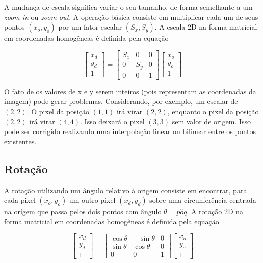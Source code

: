 \documentclass[12pt,oneside,a4paper,english,french,spanish,brazil,]{abntex2}
\begin{document}
A mudança de escala significa variar o seu tamanho, de forma semelhante a um \textit{zoom in} ou \textit{zoom out}. A operação básica consiste em multiplicar cada um de seus pontos \((x_o,y_o)\) por um fator escalar \((S_x,S_y)\). A escala 2D na forma matricial em coordenadas homogêneas é definida pela equação

\[
\begin{bmatrix}
x_d\\ 
y_d\\ 
1
\end{bmatrix}
=
\begin{bmatrix}
S_x & 0 & 0\\ 
0 & S_y & 0\\ 
0 & 0 & 1
\end{bmatrix}
\begin{bmatrix}
x_o\\ 
y_o\\ 
1
\end{bmatrix}
\]

O fato de os valores de x e y serem inteiros (pois representam as coordenadas da imagem) pode gerar problemas. Considerando, por exemplo, um escalar de \((2,2)\). O pixel da posição \((1,1)\) irá virar \((2,2)\), enquanto o pixel da posição \((2,2)\) irá virar \((4,4)\). Isso deixará o pixel \((3,3)\) sem valor de origem. Isso pode ser corrigido realizando uma interpolação linear ou bilinear entre os pontos existentes.

\subsection{Rotação}

A rotação utilizando um ângulo  relativo à origem consiste em encontrar, para cada pixel \((x_o,y_o)\) um outro pixel \((x_d,y_d)\) sobre uma circunferência centrada na origem que passa pelos dois pontos com ângulo \(\theta=p \hat{o} q\). A rotação 2D na forma matricial em coordenadas homogêneas é definida pela equação



\[
\begin{bmatrix}
x_d\\ 
y_d\\ 
1
\end{bmatrix}
=
\begin{bmatrix}
\cos{\theta} & -\sin{\theta} & 0\\ 
\sin{\theta} & \cos{\theta} & 0\\ 
0 & 0 & 1
\end{bmatrix}
\begin{bmatrix}
x_o\\ 
y_o\\ 
1
\end{bmatrix}
\]
\end{document}
